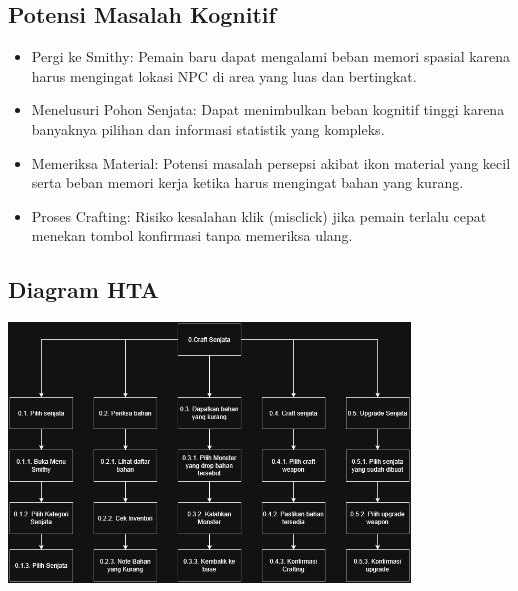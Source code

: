 \documentclass[12pt]{article}
\begin{document}
\subsection{Potensi Masalah Kognitif}

\begin{itemize}
\item Pergi ke Smithy: Pemain baru dapat mengalami beban memori spasial karena harus mengingat lokasi NPC di area yang luas dan bertingkat.
\item Menelusuri Pohon Senjata: Dapat menimbulkan beban kognitif tinggi karena banyaknya pilihan dan informasi statistik yang kompleks.
\item Memeriksa Material: Potensi masalah persepsi akibat ikon material yang kecil serta beban memori kerja ketika harus mengingat bahan yang kurang.
\item Proses Crafting: Risiko kesalahan klik (misclick) jika pemain terlalu cepat menekan tombol konfirmasi tanpa memeriksa ulang.
\end{itemize}

\subsection{Diagram HTA}

\begin{center}
    \includegraphics[width=0.8\textwidth]{Image/HTA.png}
\end{center}
\end{document}
